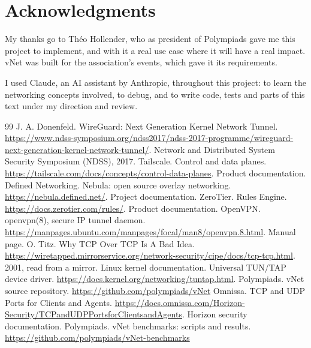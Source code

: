 \documentclass[11pt,a4paper]{article}
\begin{document}
\hypertarget{acknowledgments}{%
\section*{Acknowledgments}\label{acknowledgments}}

My thanks go to Th\'eo Hollender, who as president of Polympiads gave me this project to implement, and with it a real use case where it will have a real impact. vNet was built for the association's events, which gave it its requirements.

I used Claude, an AI assistant by Anthropic, throughout this project: to learn the networking concepts involved, to debug, and to write code, tests and parts of this text under my direction and review.

\begin{thebibliography}{99}
 J. A. Donenfeld. WireGuard: Next Generation Kernel Network Tunnel. \url{https://www.ndss-symposium.org/ndss2017/ndss-2017-programme/wireguard-next-generation-kernel-network-tunnel/}. Network and Distributed System Security Symposium (NDSS), 2017.
 Tailscale. Control and data planes. \url{https://tailscale.com/docs/concepts/control-data-planes}. Product documentation.
 Defined Networking. Nebula: open source overlay networking. \url{https://nebula.defined.net/}. Project documentation.
 ZeroTier. Rules Engine. \url{https://docs.zerotier.com/rules/}. Product documentation.
 OpenVPN. openvpn(8), secure IP tunnel daemon. \url{https://manpages.ubuntu.com/manpages/focal/man8/openvpn.8.html}. Manual page.
 O. Titz. Why TCP Over TCP Is A Bad Idea. \url{https://wiretapped.mirrorservice.org/network-security/cipe/docs/tcp-tcp.html}. 2001, read from a mirror.
 Linux kernel documentation. Universal TUN/TAP device driver. \url{https://docs.kernel.org/networking/tuntap.html}.
 Polympiads. vNet source repository. \url{https://github.com/polympiads/vNet}
 Omnissa. TCP and UDP Ports for Clients and Agents. \url{https://docs.omnissa.com/Horizon-Security/TCPandUDPPortsforClientsandAgents}. Horizon security documentation.
 Polympiads. vNet benchmarks: scripts and results. \url{https://github.com/polympiads/vNet-benchmarks}
\end{thebibliography}
\end{document}
